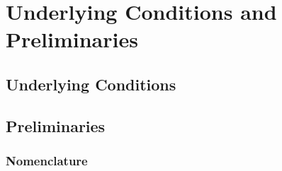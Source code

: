 
\chapter{Underlying Conditions and Preliminaries}
\label{sec:underlying-conditions_preliminaries}
\blindtext

\section{Underlying Conditions}
\blindtext

\section{Preliminaries}
\blindtext

\subsection{Nomenclature}
\label{sec:nomenclature}
\blindtext

